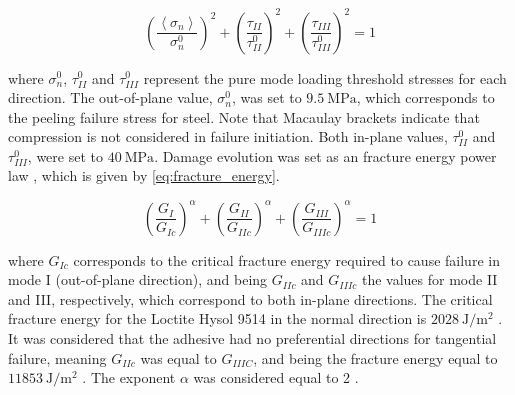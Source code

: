 \begin{equation}
\left(\frac{\left<\sigma_{n}\right>}{\sigma_{n}^{0}}\right)^{2} + \left(\frac{\tau_{II}}{\tau_{II}^{0}}\right)^{2} + \left(\frac{\tau_{III}}{\tau_{III}^{0}}\right)^{2} = 1
\label{eq:quads}
\end{equation}

where $\sigma_{n}^{0}$, $\tau_{II}^{0}$ and $\tau_{III}^{0}$ represent the pure mode loading threshold stresses for each direction. The out-of-plane value, $\sigma_{n}^{0}$, was set to $\SI{9.5}{\MPa}$, which corresponds to the peeling failure stress for steel. Note that Macaulay brackets indicate that compression is not considered in failure initiation. Both in-plane values, $\tau_{II}^{0}$ and $\tau_{III}^{0}$, were set to $\SI{40}{\MPa}$. %
Damage evolution was set as an fracture energy power law \citep{Loureiro2010, Sadowski2010, Sadowski2011, Sadowski2014, SernaMoreno2015}, which is given by \ref{eq:fracture_energy}.

\begin{equation}
\left(\frac{G_{I}}{G_{Ic}}\right)^{\alpha}+\left(\frac{G_{II}}{G_{IIc}}\right)^{\alpha}+\left(\frac{G_{III}}{G_{IIIc}}\right)^{\alpha}=1
\label{eq:fracture_energy}
\end{equation}

where $G_{Ic}$ corresponds to the critical fracture energy required to cause failure in mode I (out-of-plane direction), and being $G_{IIc}$ and $G_{IIIc}$ the values for mode II and III, respectively, which correspond to both in-plane directions. The critical fracture energy for the Loctite Hysol 9514 in the normal direction is $\SI{2028}{\J/\m^2}$ \citep{Scattina2011}. It was considered that the adhesive had no preferential directions for tangential failure, meaning $G_{IIc}$ was equal to $G_{IIIC}$, and being the fracture energy equal to $\SI{11853}{\J/\m^2}$ \citep{Scattina2011}. The exponent $\alpha$ was considered equal to 2 \citep{Loureiro2010, Sadowski2010, Sadowski2011, Sadowski2014, SernaMoreno2015}.


